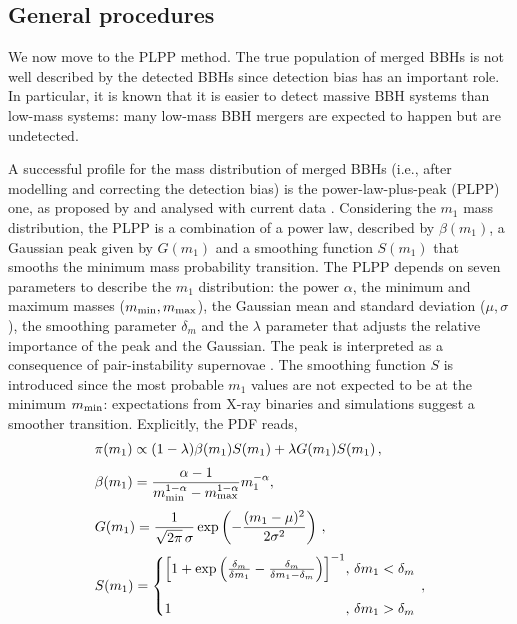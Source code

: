 \documentclass[fleqn,usenatbib,useAMS]{mnras}
\begin{document}
\subsection{General procedures}

We now move to the PLPP method. The true population of merged BBHs is not well described by the detected BBHs since detection bias has an important role. In particular, it is known that it is easier to detect massive BBH systems than low-mass systems: many low-mass BBH mergers are expected to happen but are undetected.

A successful profile for the mass distribution of merged BBHs (i.e., after modelling and correcting the detection bias) is the power-law-plus-peak (PLPP) one, as proposed by \citet{Talbot:2018cva} and analysed with current data \citep{LIGOScientific:2020kqk,KAGRA:2021duu}. Considering the $m_1$ mass distribution, the PLPP is a combination of a power law, described by $\beta(m_1)$, a Gaussian peak given by $G(m_1)$ and a smoothing function $S(m_1)$ that smooths the minimum mass probability transition.  The PLPP depends on seven parameters to describe the $m_1$ distribution: the power $\alpha$, the minimum and maximum masses ($m_{\rm min}, m_{\rm max}$), the Gaussian mean and standard deviation ($\mu, \sigma$), the smoothing parameter $\delta_m$ and the $\lambda$ parameter that adjusts the relative importance of the peak and the Gaussian. The peak is interpreted as a consequence of pair-instability supernovae \citep{Talbot:2018cva}. The smoothing function $S$ is introduced since the most probable $m_1$ values are not expected to be at the minimum $m_{\rm min}$: expectations from X-ray binaries and simulations \citep{Talbot:2018cva} suggest a smoother transition. Explicitly, the PDF reads,
\begin{align}
  &\pi(m_1)  \propto (1 - \lambda) \beta(m_1)S(m_1) + \lambda G(m_1)S(m_1)\, , \nonumber \\[.1cm]
  &\beta(m_1)  = \frac{\alpha -1}{m_{\rm min}^{1-\alpha} - m_{\rm max}^{1-\alpha}} m_1^{-\alpha}, \nonumber \\[.1cm]
  &G(m_1) = \frac{1}{\sqrt{2\pi} \, \sigma} \exp \left( - \frac{(m_1 - \mu)^2}{2 \sigma^2} \right) \, , \label{plppFunctions}\\[.1cm]
  &S(m_1) = 
    \begin{cases}
      \left[1 + \exp\left( \frac{\delta_m}{\delta m_1} - \frac{\delta_m}{\delta m_1-\delta_m} \right) \right ]^{-1}& \!\!\!\!\!\!, \, \delta m_1 < \delta_m\\[.5cm]
      1 &\!\!\!\!\!\!, \, \delta m_1 > \delta_m
    \end{cases}\, ,\nonumber
\end{align}
\end{document}
